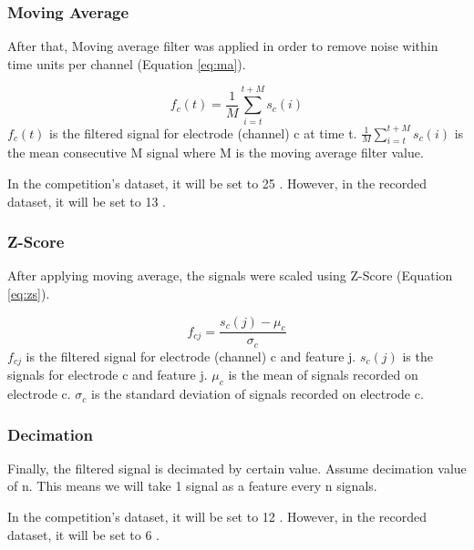 \subsubsection{Moving Average}
After that, Moving average filter was applied in order to remove noise within time units per channel (Equation \ref{eq:ma}).\par
\begin{equation}
    f_c(t) =  \frac{1}{M} \sum_{i=t}^{t+M} s_c(i)
    \label{eq:ma}
\end{equation}
$f_c(t)$ is the filtered signal for electrode (channel) c at time t. $\frac{1}{M} \sum_{i=t}^{t+M} s_c(i)$ is the mean consecutive M signal where M is the moving average filter value.\par
In the competition's dataset, it will be set to 25 \cite{inproceedings1}. However, in the recorded dataset, it will be set to 13 \cite{inproceedings2}.\par
\subsubsection{Z-Score}
After applying moving average, the signals were scaled using Z-Score (Equation \ref{eq:zs}).\par
\begin{equation}
    f_{cj} =  \frac{s_c(j) - \mu_c}{\sigma_c}
    \label{eq:zs}
\end{equation}
$f_{cj}$ is the filtered signal for electrode (channel) c and feature j. $s_c(j)$ is the signals for electrode c and feature j. $\mu_c$ is the mean of signals recorded on electrode c. $\sigma_c$ is the standard deviation of signals recorded on electrode c.\par
\subsubsection{Decimation}
Finally, the filtered signal is decimated by certain value. Assume decimation value of n. This means we will take 1 signal as a feature every n signals.\par
In the competition's dataset, it will be set to 12 \cite{inproceedings1}. However, in the recorded dataset, it will be set to 6 \cite{inproceedings2}.\par
\clearpage





